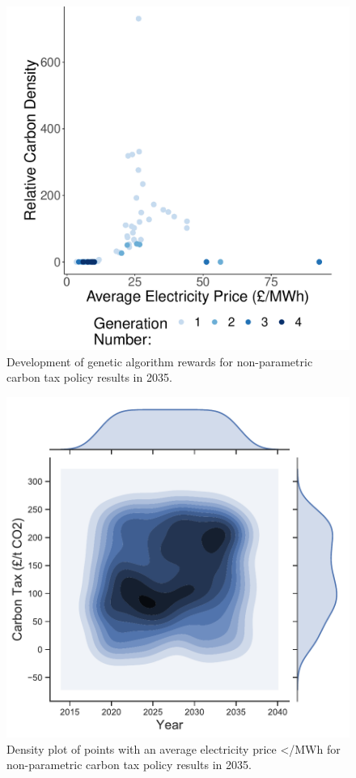 
\begin{figure}
	\centering
	\includegraphics[width=0.6\linewidth]{Chapter6/figures/results/free_points_ga_development}
	\caption{Development of genetic algorithm rewards for non-parametric carbon tax policy results in 2035.}
	\label{fig:free_points_ga_development}
\end{figure}
	
\begin{figure}
	\centering
	\includegraphics[width=0.6\linewidth]{Chapter6/figures/results/best_heatmap_no_marginals}
	\caption{Density plot of points with an average electricity price </MWh for non-parametric carbon tax policy results in 2035.}
	\label{fig:heatmap_of_free_points}
\end{figure}



